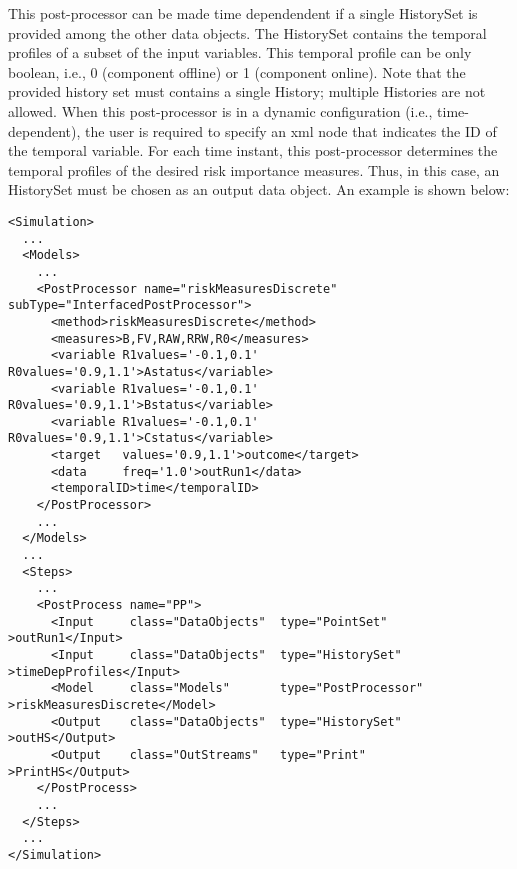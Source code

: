 This post-processor can be made time dependendent if a single HistorySet is provided among the other data objects.
The HistorySet contains the temporal profiles of a subset of the input variables. This temporal profile can be only
boolean, i.e., 0 (component offline) or 1 (component online).
Note that the provided history set must contains a single History; multiple Histories are not allowed.
When this post-processor is in a dynamic configuration (i.e., time-dependent), the user is required to specify an xml
node  that indicates the ID of the temporal variable.
For each time instant, this post-processor determines the temporal profiles of the desired risk importance measures.
Thus, in this case, an HistorySet must be chosen as an output data object.
An example is shown below:
\begin{lstlisting}[style=XML,morekeywords={subType,debug,name,class,type}]
<Simulation>
  ...
  <Models>
    ...
    <PostProcessor name="riskMeasuresDiscrete" subType="InterfacedPostProcessor">
      <method>riskMeasuresDiscrete</method>
      <measures>B,FV,RAW,RRW,R0</measures>
      <variable R1values='-0.1,0.1' R0values='0.9,1.1'>Astatus</variable>
      <variable R1values='-0.1,0.1' R0values='0.9,1.1'>Bstatus</variable>
      <variable R1values='-0.1,0.1' R0values='0.9,1.1'>Cstatus</variable>
      <target   values='0.9,1.1'>outcome</target>
      <data     freq='1.0'>outRun1</data>
      <temporalID>time</temporalID>
    </PostProcessor>
    ...
  </Models>
  ...
  <Steps>
    ...
    <PostProcess name="PP">
      <Input     class="DataObjects"  type="PointSet"        >outRun1</Input>
      <Input     class="DataObjects"  type="HistorySet"      >timeDepProfiles</Input>
      <Model     class="Models"       type="PostProcessor"   >riskMeasuresDiscrete</Model>
      <Output    class="DataObjects"  type="HistorySet"      >outHS</Output>
      <Output    class="OutStreams"   type="Print"           >PrintHS</Output>
    </PostProcess>
    ...
  </Steps>
  ...
</Simulation>
\end{lstlisting}

%
%

